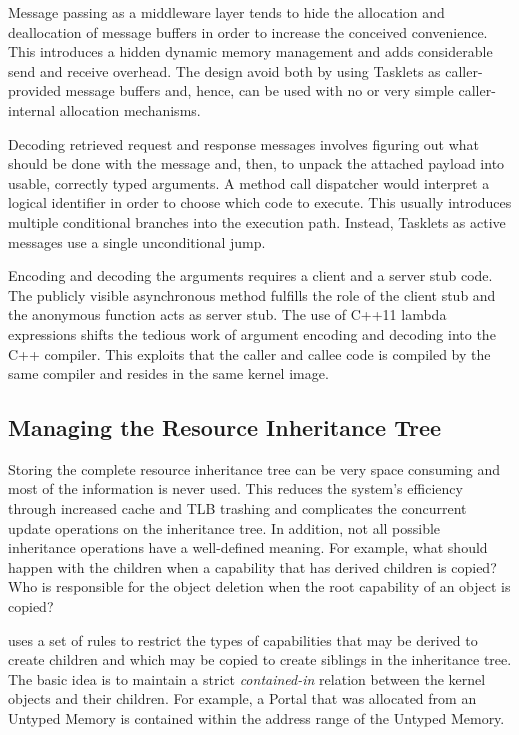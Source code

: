 Message passing as a middleware layer tends to hide the allocation and deallocation of message buffers in order to increase the conceived convenience. This introduces a hidden dynamic memory management and adds considerable send and receive overhead. The \mythos design avoid both by using Tasklets as caller-provided message buffers and, hence, can be used with no or very simple caller-internal allocation mechanisms. 

Decoding retrieved request and response messages involves figuring out what should be done with the message and, then, to unpack the attached payload into usable, correctly typed arguments. A method call dispatcher would interpret a logical identifier in order to choose which code to execute. This usually introduces multiple conditional branches into the execution path. Instead, Tasklets as active messages use a single unconditional jump. 

Encoding and decoding the arguments requires a client and a server stub code. The publicly visible asynchronous method fulfills the role of the client stub and the anonymous function acts as server stub. The use of C++11 lambda expressions shifts the tedious work of argument encoding and decoding into the C++ compiler. This exploits that the caller and callee code is compiled by the same compiler and resides in the same kernel image.

\subsection{Managing the Resource Inheritance Tree}
\label{sec:capability-impl}

Storing the complete resource inheritance tree can be very space consuming and most of the information is never used. This reduces the system's efficiency through increased cache and TLB trashing and complicates the concurrent update operations on the inheritance tree. In addition, not all possible inheritance operations have a well-defined meaning. For example, what should happen with the children when a capability that has derived children is copied? Who is responsible for the object deletion when the root capability of an object is copied?

\mythos uses a set of rules to restrict the types of capabilities that may be derived to create children and which may be copied to create siblings in the inheritance tree. The basic idea is to maintain a strict \emph{contained-in} relation between the kernel objects and their children. For example, a Portal that was allocated from an Untyped Memory is contained within the address range of the Untyped Memory.

